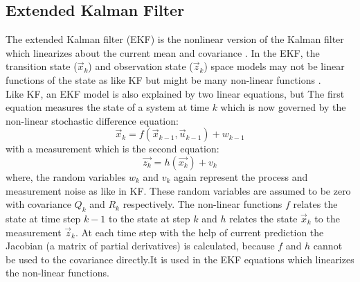\subsection{Extended Kalman Filter}
The extended Kalman filter (EKF) is the nonlinear version of the Kalman filter which linearizes about the current mean and covariance \cite{aich2010study}. In the EKF, the transition state ($\vec{x}_{k}$) and observation state ($\vec{z}_{k}$) space models may not be linear functions of the state as like KF but might be many non-linear functions \cite{aich2010study}.\\
Like KF, an EKF model is also explained by two linear equations, but The first equation measures the state of a system at time $k$ which is now governed by the non-linear stochastic difference equation\cite{aich2010study}:
$$\vec{x}_{k} = f( \vec{x}_{k-1}, \vec{u}_{k-1}) + w_{k-1}$$
with a measurement which is the second equation\cite{aich2010study}:
$$\vec{z_{k}} = h( \vec{x_{k}}) + v_{k} $$
where, the random variables $w_{k}$ and $v_{k}$ again represent the process and measurement noise as like in KF. These random variables are assumed to be zero with covariance $Q_{k}$ and $R_{k}$ respectively\cite{aich2010study}. The non-linear functions $f$ relates the state at time step $k-1$ to the state at step $k$ and $h$ relates
the state $\vec{x}_{k}$ to the measurement $\vec{z}_{k}$\cite{bishop2001introduction}. At each time step with the help of current prediction the Jacobian (a matrix of partial derivatives) is calculated, because  $f$ and $h$ cannot
be used to the covariance directly.It is used in the EKF equations which linearizes the non-linear functions\cite{aich2010study}.
